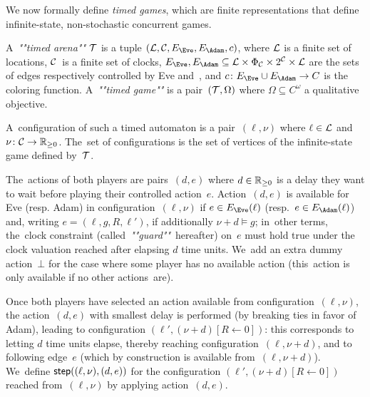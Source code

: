We now formally define \emph{timed games}, which are finite
representations that define infinite-state, non-stochastic concurrent
games. 

\begin{definition}
  A~\emph{""timed arena""} $\mathcal{T}$ is a tuple $(\Locs,
  \Clocks,\EE,\EA, c)$, where $\mathcal{L}$ is a finite set of locations,
  $\mathcal{C}$~is a finite set of clocks, $\EE,\EA \subseteq \Locs \times
  \Phi_\Clocks \times 2^\Clocks \times \mathcal{L}$ are the sets of
  edges respectively controlled by Eve and~\Adam,
  and $c\colon \EE\cup\EA \to C$ is the coloring function.
  A~\emph{""timed game""} is a pair~$(\mathcal{T},\Omega)$ where
  $\Omega \subseteq C^\omega$ a qualitative objective.
\end{definition}


A~configuration of such a timed automaton is a pair~$(\ell,\nu)$ where
$\ell\in\mathcal{L}$ and $\nu\colon \mathcal{C}\to\mathbb{R}_{\geq 0}$.  The~set of
configurations is the set of vertices of the infinite-state game
defined by~$\mathcal{T}$.

The~actions of both players are pairs~$(d,e)$ where $d\in\mathbb{R}_{\geq 0}$ is a
delay they want to wait before playing their controlled
action~$e$. Action~$(d,e)$ is available for Eve (resp. Adam) in
configuration~$(\ell,\nu)$ if $e\in\EE(\ell)$ (resp.~$e\in\EA(\ell)$)
and, writing $e=(\ell,g,R,\ell')$, if additionally $\nu+d\models g$;
in~other terms, the~clock constraint (called~\emph{""guard""}~hereafter)
on~$e$ must hold true under the clock valuation reached after elapsing
$d$ time units. We~add an extra dummy action~$\bot$ for the case where
some player has no available action (this~action is only available if
no other actions~are).

Once both players have selected an action available from
configuration~$(\ell,\nu)$, the action~$(d,e)$ with smallest delay is
performed (by breaking ties in favor of Adam), leading to configuration $(\ell',(\nu+d)[R\leftarrow 0])$:
this corresponds to letting $d$ time units elapse, thereby reaching
configuration~$(\ell,\nu+d)$, and to following edge~$e$ (which by
construction is available from~$(\ell,\nu+d)$).  We~define
$\mathsf{step}((\ell,\nu),(d,e))$ for the configuration
$(\ell',(\nu+d)[R\leftarrow 0])$ reached from~$(\ell,\nu)$ by applying
action~$(d,e)$.



